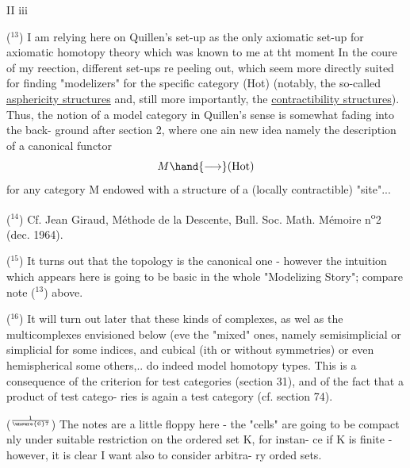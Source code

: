 II iii

($^{13}$) I am relying here on Quillen's set-up as the  only axiomatic
set-up for axiomatic homotopy theory which was known to me at tht moment
In the coure of my reection,  different set-ups re peeling out,
which seem more directly suited for finding "modelizers" for the specific
category (Hot) (notably, the so-called \uline{asphericity structures} and, still
more importantly, the \uline{contractibility structures}). Thus, the notion
of a model category in Quillen's sense is somewhat fading into the back-%
ground after section 2, where one ain new idea \hand{,} namely the
description of a canonical functor
\[ M \hand{\longrightarrow} (\mathrm{Hot}) \]
for any category M endowed with a structure of a (locally contractible)
"site"...

($^{14}$) Cf. Jean Giraud, Méthode de la Descente, Bull. Soc. Math.
Mémoire n\textsuperscript{o}2 (dec. 1964).

($^{15}$) It turns out that the  topology is   the canonical one -
however the intuition which appears here is going to be basic in the
whole "Modelizing Story";  compare note ($^{13}$) above.

($^{16}$) It will turn out later that these kinds of complexes, as wel
as the multicomplexes envisioned below (eve the "mixed" ones, namely
semisimplicial or simplicial for some indices, and cubical (ith or
without symmetries)\hand{,} or even hemispherical\hand{,}   some others,.. do indeed
model homotopy types. This is a consequence of the criterion for test
categories (section 31), and of the fact that a product of test catego-%
ries is again a test category (cf. section 74).

($^{1\over{\unsure{6}}{7}}$) The notes are a little floppy here - the "cells" are going to be
compact nly under suitable restriction on the ordered set K, for instan-%
ce if K is finite - however, it is clear I want also to consider arbitra-%
ry orded sets.

